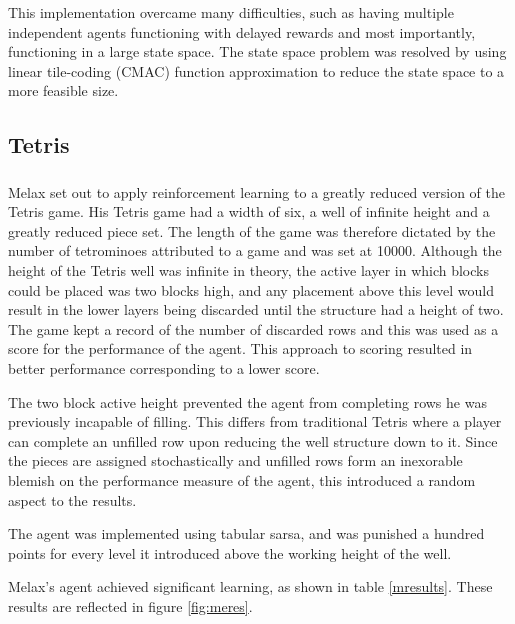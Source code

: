 \documentclass{rucsthesis}
\begin{document}
This implementation overcame many difficulties, such as having multiple independent agents functioning with delayed rewards and most importantly, functioning in a large state space. The state space problem was resolved by using linear tile-coding (CMAC) function approximation to reduce the state space to a more feasible size\citep{keepaway}.

\subsection{Tetris}

\subsubsection{\cite{melaxtetris}}

Melax set out to apply reinforcement learning to a greatly reduced version of the Tetris game. His Tetris game had a width of six, a well of infinite height and a greatly reduced piece set. The length of the game was therefore dictated by the number of tetrominoes attributed to a game and was set at 10000. Although the height of the Tetris well was infinite in theory, the active layer in which blocks could be placed was two blocks high, and any placement above this level would result in the lower layers being discarded until the structure had a height of two. The game kept a record of the number of discarded rows and this was used as a score for the performance of the agent. This approach to scoring resulted in better performance corresponding to a lower score. 

The two block active height prevented the agent from completing rows he was previously incapable of filling. This differs from traditional Tetris where a player can complete an unfilled row upon reducing the well structure down to it. Since the pieces are assigned stochastically and unfilled rows form an inexorable blemish on the performance measure of the agent, this introduced a random aspect to the results.

The agent was implemented using tabular sarsa, and was punished a hundred points for every level it introduced above the working height of the well.

Melax's agent achieved significant learning, as shown in table \ref{mresults}. These results are reflected in figure \ref{fig:meres}.
\end{document}
